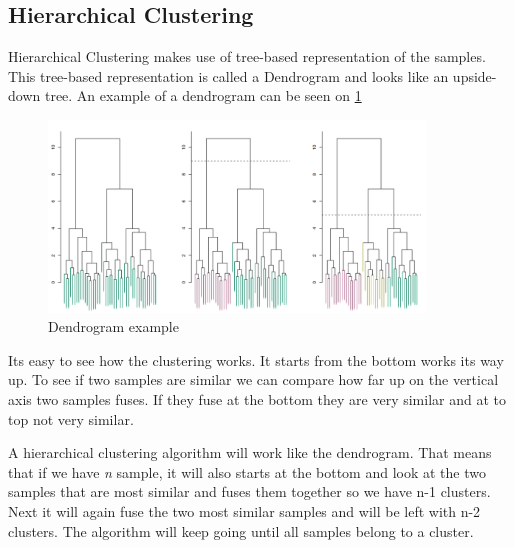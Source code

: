 \subsection{Hierarchical Clustering}
Hierarchical Clustering makes use of tree-based representation of the samples. This tree-based representation is called a Dendrogram and looks like an upside-down tree. An example of a dendrogram can be seen on \cref{fig:dendrogram}\cite{book_2015}

\begin{figure}[H]
	\centering
	\includegraphics[width=10cm]{Img/Dendrogram_example.PNG}
	\caption{Dendrogram example}
	\label{fig:dendrogram}
\end{figure} 

Its easy to see how the clustering works. It starts from the bottom works its way up. To see if two samples are similar we can compare how far up on the vertical axis two samples fuses. If they fuse at the bottom they are very similar and at to top not very similar. 

A hierarchical clustering algorithm will work like the dendrogram. That means that if we have \textit{n} sample, it will also starts at the bottom and look at the two samples that are most similar and fuses them together so we have n-1 clusters. Next it will again fuse the two most similar samples and will be left with n-2 clusters. The algorithm will keep going until all samples belong to a cluster. 
 



